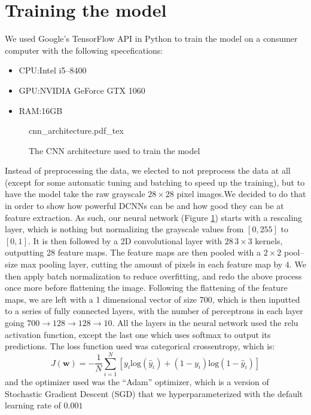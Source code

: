 \documentclass[conference]{IEEEtran}
\begin{document}
\section{Training the model}\label{sec:train}
We used Google's TensorFlow API\cite{tensorflow2015-whitepaper} in Python to train the model on a consumer computer with the following specefications:
\begin{itemize}
    \item CPU:\@ Intel i5--8400
    \item GPU:\@ NVIDIA GeForce GTX 1060
    \item RAM:\@ 16GB
\end{itemize}
\begin{figure}[!htp]
    \centering
    \def\svgwidth{\columnwidth}
    \scriptsize
    {cnn_architecture.pdf_tex}
    \caption{The CNN architecture used to train the model}\label{fig:cnn_architecture}
\end{figure}
Instead of preprocessing the data, we elected to not preprocess the data at all (except for some automatic tuning and batching to speed up the training), but to have the model take the raw grayscale $28 \times 28$ pixel images.\@ We decided to do that in order to show how powerful DCNNs can be and how good they can be at feature extraction.\@
As such, our neural network (Figure \ref{fig:cnn_architecture}) starts with a rescaling layer, which is nothing but normalizing the grayscale values from $[0, 255]$ to $[0, 1]$. It is then followed by a 2D convolutional layer with $28 \, 3 \times 3$ kernels, outputting 28 feature maps. The feature maps are then pooled with a $2 \times 2$ pool--size max pooling layer, cutting the amount of pixels in each feature map by $4$. We then apply batch normalization\cite{batchnorm} to reduce overfitting, and redo the above process once more before flattening the image.\@
Following the flattening of the feature maps, we are left with a 1 dimensional vector of size 700, which is then inputted to a series of fully connected layers, with the number of perceptrons in each layer going $700 \to 128 \to 128 \to 10$. All the layers in the neural network used the relu activation function, except the last one which uses softmax to output its predictions.
The loss function used was categorical crossentropy, which is:
\begin{equation}
    J(\textbf{w}) = -\frac{1}{N} \sum_{i=1}^{N} \left[ y_i \text{log}(\hat{y}_i) + (1-y_i) \text{log}(1-\hat{y}_i) \right]
\end{equation}
and the optimizer used was the ``Adam'' optimizer, which is a version of Stochastic Gradient Descent (SGD)\cite{adam} that we hyperparameterized with the default learning rate of $0.001$
\end{document}
